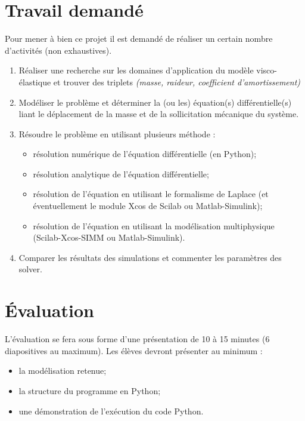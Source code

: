 \documentclass[10pt,fleqn]{article} %
\begin{document}
\begin{multicols}{2}
\section{Travail demandé}
Pour mener à bien ce projet il est demandé de réaliser un certain nombre d'activités (non exhaustives).
\begin{enumerate}
\item Réaliser une recherche sur les domaines d'application du modèle visco-élastique et trouver des triplets \textit{(masse, raideur, coefficient d'amortissement)}
\item Modéliser le problème et déterminer la (ou les) équation(s) différentielle(s) liant le déplacement de la masse et de la sollicitation mécanique du système.
\item Résoudre le problème en utilisant plusieurs méthode : 
\begin{itemize}
\item résolution numérique de l'équation différentielle (en Python);
\item résolution analytique de l'équation différentielle;
\item résolution de l'équation en utilisant le formalisme de Laplace (et éventuellement le module Xcos de Scilab ou Matlab-Simulink);
\item résolution de l'équation en utilisant la modélisation multiphysique (Scilab-Xcos-SIMM ou Matlab-Simulink).
\end{itemize}
\item Comparer les résultats des simulations et commenter les paramètres des solver.
\end{enumerate}

\section{Évaluation}
L'évaluation se fera sous forme d'une présentation de 10 à 15 minutes (6 diapositives au maximum). Les élèves devront présenter au minimum : 
\begin{itemize}
\item la modélisation retenue;
\item la structure du programme en Python;
\item une démonstration de l'exécution du code Python.
\end{itemize}

\end{multicols}


\ifprof
\newpage
\end{document}
